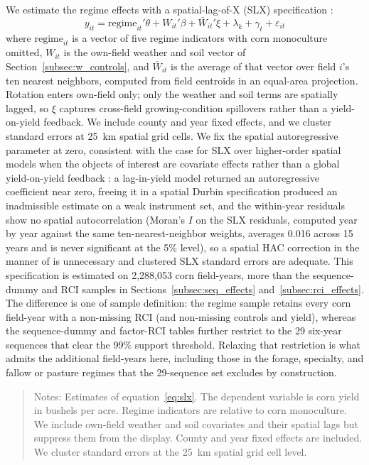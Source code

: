 \documentclass[12pt,letterpaper]{article}
\theoremstyle{remark}
\theoremstyle{remark}
\let\oldtable\table
\let\endoldtable\endtable
\renewenvironment{table}[1][H]{\oldtable[H]}{\endoldtable}
\theoremstyle{plain}
\theoremstyle{definition}
\begin{document}
We estimate the regime effects with a spatial-lag-of-X (SLX) specification \citep{HalleckVega2015, LeSagePace2009, Elhorst2014}:
%
\begin{equation}
  y_{it} = \text{regime}_{it}'\theta + W_{it}'\beta + \bar W_{it}'\xi
  + \lambda_k + \gamma_t + \varepsilon_{it}
  \label{eq:slx}
\end{equation}
%
where $\text{regime}_{it}$ is a vector of five regime indicators with corn monoculture omitted, $W_{it}$ is the own-field weather and soil vector of Section~\ref{subsec:w_controls}, and $\bar W_{it}$ is the average of that vector over field $i$'s ten nearest neighbors, computed from field centroids in an equal-area projection. Rotation enters own-field only; only the weather and soil terms are spatially lagged, so $\xi$ captures cross-field growing-condition spillovers rather than a yield-on-yield feedback. We include county and year fixed effects, and we cluster standard errors at 25\, km spatial grid cells. We fix the spatial autoregressive parameter at zero, consistent with the case for SLX over higher-order spatial models when the objects of interest are covariate effects rather than a global yield-on-yield feedback \citep{GibbonsOverman2012}: a lag-in-yield model returned an autoregressive coefficient near zero, freeing it in a spatial Durbin specification produced an inadmissible estimate on a weak instrument set, and the within-year residuals show no spatial autocorrelation (Moran's $I$ on the SLX residuals, computed year by year against the same ten-nearest-neighbor weights, averages 0.016 across 15 years and is never significant at the 5\% level), so a spatial HAC correction in the manner of \citet{Conley1999} is unnecessary and clustered SLX standard errors are adequate. This specification is estimated on 2,288,053 corn field-years, more than the sequence-dummy and RCI samples in Sections~\ref{subsec:seq_effects} and~\ref{subsec:rci_effects}. The difference is
one of sample definition: the regime sample retains every corn field-year with a non-missing RCI (and non-missing controls and yield), whereas the sequence-dummy and factor-RCI tables further restrict to the 29 six-year sequences that clear the 99\% support threshold. Relaxing that restriction is what admits the additional field-years here, including those in the forage, specialty, and fallow or pasture regimes that the 29-sequence set excludes by construction.

\begin{table}[H]
  \centering
  \caption{Corn yield by rotation regime (SLX specification).}
  \label{tab:slx_corn_regime}
  
\end{table}
\begin{quote}
\small
Notes: Estimates of equation~\eqref{eq:slx}. The dependent variable is corn yield in bushels per acre. Regime indicators are relative to corn monoculture. We include own-field weather and soil covariates and their spatial lags but suppress them from the display. County and year fixed effects are included. We cluster standard errors at the 25\, km spatial grid cell level.
\end{quote}
\end{document}
